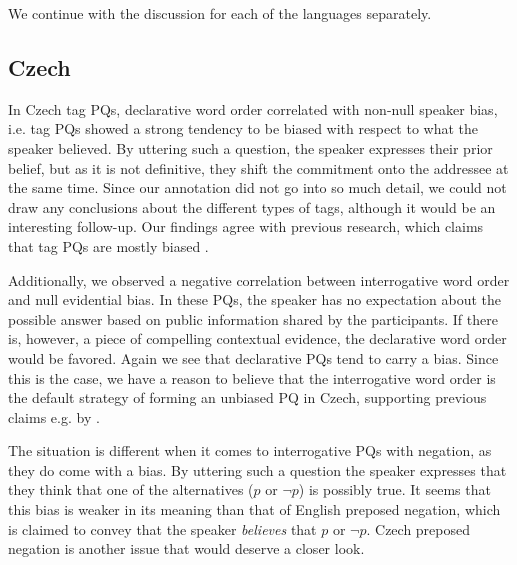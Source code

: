 \documentclass[output=paper,colorlinks,citecolor=brown]{langscibook}
\begin{document}
We continue with the discussion for each of the languages separately.

\subsection{Czech}

In Czech tag PQs, declarative word order correlated with non-null speaker bias, i.e. tag PQs showed a strong tendency to be biased with respect to what the speaker believed. By uttering such a question, the speaker expresses their prior belief, but as it is not definitive, they shift the commitment onto the addressee at the same time. Since our annotation did not go into so much detail, we could not draw any conclusions about the different types of tags, although it would be an interesting follow-up. Our findings agree with previous research, which claims that tag PQs are mostly biased \citep{bill2022question}.

Additionally, we observed a negative correlation between interrogative word order and null evidential bias. In these PQs, the speaker has no expectation about the possible answer based on public information shared by the participants. If there is, however, a piece of compelling contextual evidence, the declarative word order would be favored. Again we see that declarative PQs tend to carry a bias. Since this is the case, we have a reason to believe that the interrogative word order is the default strategy of forming an unbiased PQ in Czech, supporting previous claims e.g. by \citet{Sticha1995a}. 

The situation is different when it comes to interrogative PQs with negation, as they do come with a bias. By uttering such a question the speaker expresses that they think that one of the alternatives ($p$ or $\neg p$) is possibly true. It seems that this bias is weaker in its meaning than that of English preposed negation, which is claimed to convey that the speaker \textit{believes} that $p$ or $\neg p$. Czech preposed negation is another issue that would deserve a closer look.


    
\end{document}

